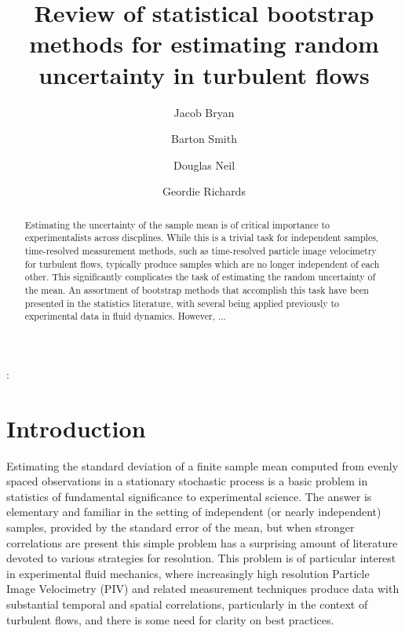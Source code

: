 \documentclass[onecolumn,12pt]{iopart}
\begin{document}
\title{Review of statistical bootstrap methods for estimating random uncertainty in turbulent flows}

\author{Jacob Bryan}
\address{Mechanical and Aerospace Engineering, Utah State University }

\author{Barton Smith}
\address{Mechanical and Aerospace Engineering, Utah State University }

\author{Douglas Neil}
\address{LaVision Inc.}
\ead{}

\author{Geordie Richards}
\address{Mechanical and Aerospace Engineering, Utah State University }

\begin{abstract}
Estimating the uncertainty of the sample mean is of critical importance to experimentalists across discplines. While this is a trivial task for independent samples, time-resolved measurement methods, such as time-resolved particle image velocimetry for turbulent flows, typically produce samples which are no longer independent of each other. This significantly complicates the task of estimating the random uncertainty of the mean. An assortment of bootstrap methods that accomplish this task have been presented in the statistics literature, with several being applied previously to experimental data in fluid dynamics. However, ...

\end{abstract}


:  

\maketitle

\section{Introduction}
Estimating the standard deviation of a finite sample mean computed from evenly spaced observations in a stationary stochastic process is a basic problem in statistics of fundamental significance to experimental science.  The answer is elementary and familiar in the setting of independent (or nearly independent) samples, provided by the standard error of the mean, but when stronger correlations are present this simple problem has a surprising amount of literature devoted to various strategies for resolution.  This problem is of particular interest in experimental fluid mechanics, where increasingly high resolution Particle Image Velocimetry (PIV) and related measurement techniques produce data with substantial temporal and spatial correlations, particularly in the context of turbulent flows, and there is some need for clarity on best practices.  
\end{document}
